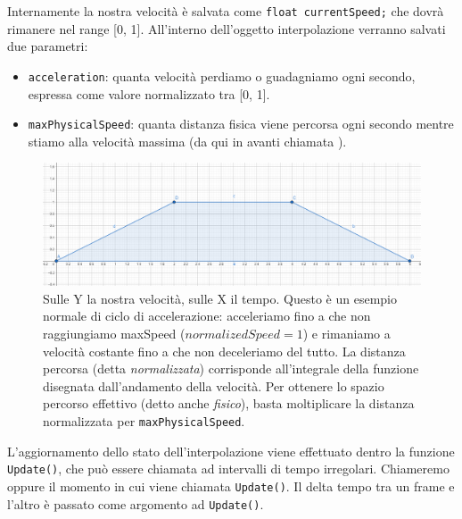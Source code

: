 \documentclass[main.tex]{subfiles}
\begin{document}
Internamente la nostra velocità è salvata come \lstinline{float currentSpeed;} che dovrà rimanere nel range [0, 1]. All'interno dell'oggetto interpolazione verranno salvati due parametri:
\begin{itemize}
    \item \lstinline{acceleration}: quanta velocità perdiamo o guadagniamo ogni secondo, espressa come valore normalizzato tra [0, 1].
    \item \lstinline{maxPhysicalSpeed}: quanta distanza fisica viene percorsa ogni secondo mentre stiamo alla velocità massima (da qui in avanti chiamata ).
\end{itemize}
\begin{figure}[H]
    \centering
    \includegraphics[width=1\linewidth]{img/interpolazione/normalSpeed.png}
    \caption{Sulle Y la nostra velocità, sulle X il tempo. Questo è un esempio normale di ciclo di accelerazione: acceleriamo fino a che non raggiungiamo maxSpeed ($normalizedSpeed = 1$) e rimaniamo a velocità costante fino a che non deceleriamo del tutto. La distanza percorsa (detta \textit{normalizzata}) corrisponde all'integrale della funzione disegnata dall'andamento della velocità. Per ottenere lo spazio percorso effettivo (detto anche \textit{fisico}), basta moltiplicare la distanza normalizzata per \lstinline{maxPhysicalSpeed}.}
    \label{fig:4_normalSpeed}
\end{figure}

\noindent L'aggiornamento dello stato dell'interpolazione viene effettuato dentro la funzione \lstinline{Update()}, che può essere chiamata ad intervalli di tempo irregolari. Chiameremo  oppure  il momento in cui viene chiamata \lstinline{Update()}. Il delta tempo tra un frame e l'altro è passato come argomento ad \lstinline{Update()}.
\end{document}
